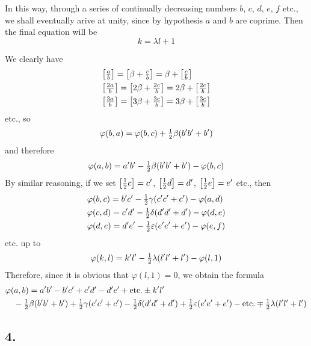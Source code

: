 \documentclass[twoside,12pt]{memoir}
\let\oldfrac\frac
\def\frac#1#2{\mathchoice{\tfrac{#1}{#2}}{\oldfrac{#1}{#2}}{\genfrac{}{}{}{2}{#1}{#2\mathstrut}}{\genfrac{}{}{}{3}{#1}{#2\mathstrut}}}
\begin{document}
In this way, through a series of continually decreasing numbers \(b\), \(c\), \(d\), \(e\), \(f\) etc{.}, we shall eventually arive at unity, since by hypothesis \(a\) and \(b\) are coprime.  Then the final equation will be
\[k=\lambda l+1\]

We clearly have
\[\begin{aligned}
& {\left[\frac{a}{b}\right]=\left[\beta+\frac{c}{b}\right]=\beta+\left[\frac{c}{b}\right]} \\
& {\left[\frac{2 a}{b}\right]=\left[2 \beta+\frac{2 c}{b}\right]=2 \beta+\left[\frac{2 c}{b}\right]} \\
& {\left[\frac{3 a}{b}\right]=\left[3 \beta+\frac{3 c}{b}\right]=3 \beta+\left[\frac{3 c}{b}\right]}
\end{aligned}\]
etc{.}, so
\[\varphi(b, a)=\varphi(b, c)+\frac{1}{2} \beta (b^{\prime} b^{\prime}+b^{\prime})\]
and therefore
\[\varphi(a, b)=a^{\prime} b^{\prime}-\frac{1}{2} \beta (b^{\prime} b^{\prime}+b^{\prime})-\varphi(b, c)\]
By similar reasoning, if we set \(\left[\frac{1}{2} c\right]=c^{\prime}\), \(\left[\frac{1}{2} d\right]=d^{\prime}\), \(\left[\frac{1}{2} e\right]=e^{\prime}\) etc{.}, then
\[\begin{aligned}
& \varphi(b, c)=b^{\prime} c^{\prime}-\frac{1}{2} \gamma(c^{\prime} c^{\prime}+c^{\prime})-\varphi(a, d) \\
& \varphi(c, d)=c^{\prime} d^{\prime}-\frac{1}{2} \delta(d^{\prime} d^{\prime}+d^{\prime})-\varphi(d, e) \\
& \varphi(d, e)=d^{\prime} e^{\prime}-\frac{1}{2} \varepsilon(e^{\prime} e^{\prime}+e^{\prime})-\varphi(e, f)
\end{aligned}\]
etc{.} up to
\[\varphi(k, l)=k^{\prime} l^{\prime}-\frac{1}{2} \lambda(l^{\prime} l^{\prime}+l^{\prime})-\varphi(l, 1)\]
Therefore, since it is obvious that \(\varphi(l, 1)=0\), we obtain the formula
\[\begin{aligned}
& \varphi(a, b)=a^{\prime} b^{\prime}-b^{\prime} c^{\prime}+c^{\prime} d^{\prime}-d^{\prime} e^{\prime}+\text{etc{.}} \pm k^{\prime} l^{\prime} \\
& \quad-\frac{1}{2} \beta (b^{\prime} b^{\prime}+b^{\prime})+\frac{1}{2} \gamma(c^{\prime} c^{\prime}+c^{\prime})-\frac{1}{2} \delta(d^{\prime} d^{\prime}+d^{\prime})+\frac{1}{2} \varepsilon(e^{\prime} e^{\prime}+e^{\prime})-\text{etc{.}} \mp \frac{1}{2} \lambda(l^{\prime} l^{\prime}+l^{\prime})
\end{aligned}\]

\subsection*{4.}
 
\end{document}
